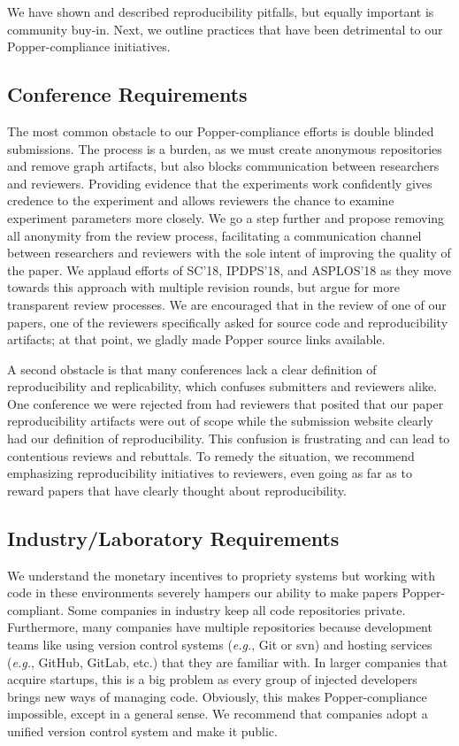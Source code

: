We have shown and described reproducibility pitfalls, but equally important is
community buy-in. Next, we outline practices that have been detrimental to our
Popper-compliance initiatives.

\subsection{Conference Requirements}

The most common obstacle to our Popper-compliance efforts is double blinded
submissions. The process is a burden, as we must create anonymous repositories
and remove graph artifacts, but also blocks communication between researchers
and reviewers. Providing evidence that the experiments work confidently gives
credence to the experiment and allows reviewers the chance to examine
experiment parameters more closely. We go a step further and propose removing
all anonymity from the review process, facilitating a communication channel
between researchers and reviewers with the sole intent of improving the quality
of the paper. We applaud efforts of SC'18, IPDPS'18, and ASPLOS'18 as they move
towards this approach with multiple revision rounds, but argue for more
transparent review processes. We are encouraged that in the review of one of
our papers, one of the reviewers specifically asked for source code and
reproducibility artifacts; at that point, we gladly made Popper source links
available.

A second obstacle is that many conferences lack a clear definition of
reproducibility and replicability, which confuses submitters and reviewers
alike. One conference we were rejected from had reviewers that posited that our
paper reproducibility artifacts were out of scope while the submission website
clearly had our definition of reproducibility. This confusion is frustrating
and can lead to contentious reviews and rebuttals. To remedy the situation, we
recommend emphasizing reproducibility initiatives to reviewers, even going as
far as to reward papers that have clearly thought about reproducibility.

\subsection{Industry/Laboratory Requirements}
\label{sec:reqs}

We understand the monetary incentives to propriety systems but working with
code in these environments severely hampers our ability to make papers
Popper-compliant.  Some companies in industry keep all code repositories
private.  Furthermore, many companies have multiple repositories because
development teams like using version control systems ({\it e.g.}, Git or svn)
and hosting services ({\it e.g.}, GitHub, GitLab, etc.) that they are familiar
with. In larger companies that acquire startups, this is a big problem as every
group of injected developers brings new ways of managing code.  Obviously, this
makes Popper-compliance impossible, except in a general sense.  We recommend
that companies adopt a unified version control system and make it public.

